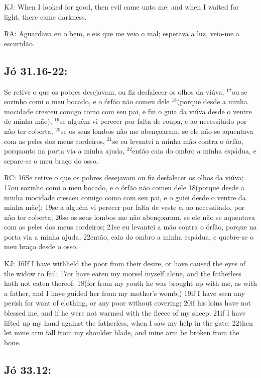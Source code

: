 KJ: When I looked for good, then evil came unto me: and when I waited for light, there came darkness.

RA: Aguardava eu o bem, e eis que me veio o mal; esperava a luz, veio-me a escuridão.

\subsection{Jó 31.16-22:}

 Se retive o que os pobres desejavam, ou fiz desfalecer os olhos da viúva, $^{\mathrm{17}}$ou se\uwave{,} sozinho comi o meu bocado, e o órfão não comeu dele $^{\mathrm{18}}$(porque desde a minha mocidade cresceu comigo como com seu pai, e fui o guia da viúva desde o ventre de minha mãe), $^{\mathrm{19}}$se alguém vi perecer por falta de roupa, e ao necessitado por não ter coberta, $^{\mathrm{20}}$se os seus lombos não me abençoaram, se ele não se aquentava com as peles dos meus cordeiros, $^{\mathrm{21}}$se eu levantei a minha mão contra o órfão, porquanto na porta via a minha ajuda, $^{\mathrm{22}}$então caia do ombro a minha espádua, e separe-se o meu braço do osso.

RC: 16Se retive o que os pobres desejavam ou fiz desfalecer os olhos da viúva; 17ou sozinho comi o meu bocado, e o órfão não comeu dele 18(porque desde a minha mocidade cresceu comigo como com seu pai, e o guiei desde o ventre da minha mãe); 19se a alguém vi perecer por falta de veste e, ao necessitado, por não ter coberta; 20se os seus lombos me não abençoaram, se ele não se aquentava com as peles dos meus cordeiros; 21se eu levantei a mão contra o órfão, porque na porta via a minha ajuda, 22então, caia do ombro a minha espádua, e quebre-se o meu braço desde o osso.

KJ: 16If I have withheld the poor from their desire, or have caused the eyes of the widow to fail; 17or have eaten my morsel myself alone, and the fatherless hath not eaten thereof; 18(for from my youth he was brought up with me, as with a father, and I have guided her from my mother’s womb;) 19if I have seen any perish for want of clothing, or any poor without covering; 20if his loins have not blessed me, and if he were not warmed with the fleece of my sheep; 21if I have lifted up my hand against the fatherless, when I saw my help in the gate: 22then let mine arm fall from my shoulder blade, and mine arm be broken from the bone.

\subsection{Jó 33.12:}

